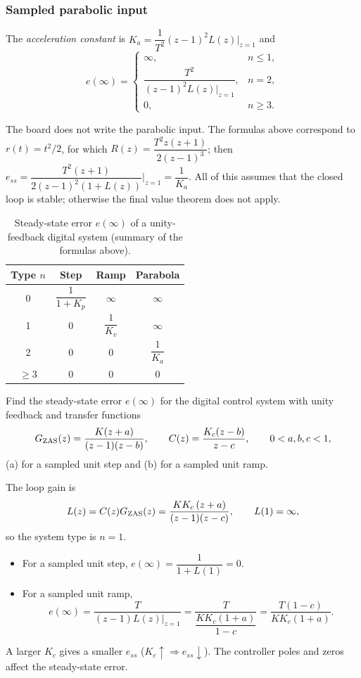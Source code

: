 \subsubsection*{Sampled parabolic input}
The \emph{acceleration constant} is $K_a=\dfrac{1}{T^{2}}(z-1)^{2}L(z)\Big|_{z=1}$ and
\[
  e(\infty)=\begin{cases}\infty,&n\le1,\\[1mm]\dfrac{T^{2}}{(z-1)^{2}L(z)\big|_{z=1}},&n=2,\\[3mm]0,&n\ge3.\end{cases}
\]
\begin{remark}[added]
The board does not write the parabolic input. The formulas above correspond to $r(t)=t^{2}/2$, for which
$R(z)=\dfrac{T^{2}z(z+1)}{2(z-1)^{3}}$; then $e_{ss}=\dfrac{T^{2}(z+1)}{2(z-1)^{2}(1+L(z))}\Big|_{z=1}=\dfrac1{K_a}$.
All of this assumes that the closed loop is stable; otherwise the final value theorem does not apply.
\end{remark}

\begin{table}[ht]
\centering
\caption{Steady-state error $e(\infty)$ of a unity-feedback digital system (summary of the formulas above).}\label{tab:ess}
\renewcommand{\arraystretch}{1.5}
\begin{tabular}{c|c|c|c}
Type $n$ & Step & Ramp & Parabola\\\hline
0 & $\dfrac{1}{1+K_p}$ & $\infty$ & $\infty$\\
1 & $0$ & $\dfrac{1}{K_v}$ & $\infty$\\
2 & $0$ & $0$ & $\dfrac{1}{K_a}$\\
$\ge3$ & $0$ & $0$ & $0$
\end{tabular}
\end{table}

\begin{example}
Find the steady-state error $e(\infty)$ for the digital control system with unity feedback and transfer
functions
\[
  G_{\mathrm{ZAS}}(z)=\frac{K(z+a)}{(z-1)(z-b)},\qquad C(z)=\frac{K_c(z-b)}{z-c},\qquad 0<a,b,c<1,
\]
(a) for a sampled unit step and (b) for a sampled unit ramp.

\noindent The loop gain is
\[
  L(z)=C(z)G_{\mathrm{ZAS}}(z)=\frac{K K_c\,(z+a)}{(z-1)(z-c)},\qquad L(1)=\infty,
\]
so the system type is $n=1$.
\begin{itemize}
  \item For a sampled unit step, $e(\infty)=\dfrac{1}{1+L(1)}=0$.
  \item For a sampled unit ramp,
  \[
    e(\infty)=\frac{T}{(z-1)L(z)\big|_{z=1}}=\frac{T}{\dfrac{K K_c(1+a)}{1-c}}=\frac{T(1-c)}{K K_c(1+a)}.
  \]
\end{itemize}
A larger $K_c$ gives a smaller $e_{ss}$ ($K_c\uparrow\Rightarrow e_{ss}\downarrow$). The controller poles and zeros
affect the steady-state error.
\end{example}

